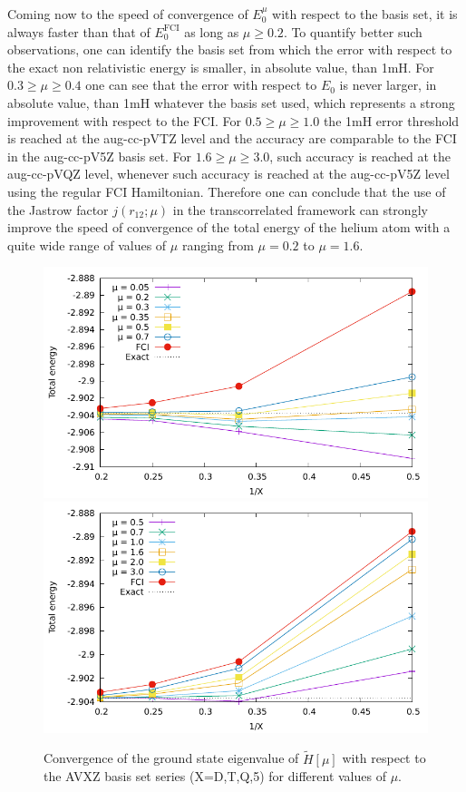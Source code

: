 \documentclass[aip,jcp,reprint,noshowkeys,superscriptaddress]{revtex4-1}
\begin{document}
Coming now to the speed of convergence of $E_0^\mu$ with respect to the basis set, it is always faster than that of $E_0^\text{FCI}$ as long as $\mu \ge 0.2$. 
To quantify better such observations, one can identify the basis set from which the error with respect to the exact non relativistic energy is smaller, in absolute value, than 1mH. 
For $0.3\ge\mu\ge0.4$ one can see that the error with respect to $E_0$ is never larger, in absolute value, than 1mH whatever the basis set used, which represents a strong improvement with respect to the FCI. For $0.5\ge \mu \ge 1.0$ the 1mH error threshold is reached at the aug-cc-pVTZ level and the accuracy are comparable to the FCI in the aug-cc-pV5Z basis set. For $1.6\ge \mu \ge 3.0$, such accuracy is reached at the aug-cc-pVQZ level, whenever such accuracy is reached at the aug-cc-pV5Z level using the regular FCI Hamiltonian. 
Therefore one can conclude that the use of the Jastrow factor $j(r_{12};\mu)$ in the transcorrelated framework can strongly improve the speed of convergence of the total energy of the helium atom with a quite wide range of values of $\mu$ ranging from $\mu=0.2$ to $\mu=1.6$. 
\begin{figure}
 \label{fig_conv_e_mu}
        \includegraphics[width=0.45\linewidth]{E_conv_basis_small_mu.pdf}
        \includegraphics[width=0.45\linewidth]{E_conv_basis_large_mu.pdf}\\
        \caption{Convergence of the ground state eigenvalue of $\tilde{H}[\mu]$ with respect to the AVXZ basis set series (X=D,T,Q,5) for different values of $\mu$.}
\end{figure}
\end{document}
